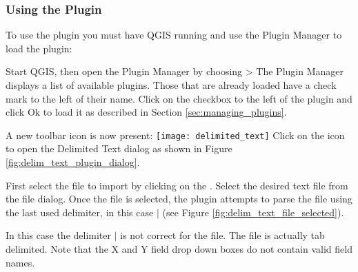 \subsubsection{Using the Plugin}
To use the plugin you must have QGIS running and use the Plugin Manager to load the plugin:

Start QGIS, then open the Plugin Manager by choosing  > 
The Plugin Manager displays a list of available plugins.
Those that are already loaded have a check mark to the left of their name.
Click on the checkbox to the left of the  plugin and click Ok to load it as described in Section \ref{sec:managing_plugins}.


A new toolbar icon is now present:
\texttt{[image: delimited\_text]}
Click on the icon  to open the Delimited Text dialog as shown in Figure
\ref{fig:delim_text_plugin_dialog}.


First select the file to import by clicking on the \browsebutton .
Select the desired text file from the file dialog.
Once the file is selected, the plugin attempts to parse the file using the last used delimiter, in this case \mbox{$|$} (see Figure \ref{fig:delim_text_file_selected}).

  
In this case the delimiter \mbox{$|$} is not correct for the file.
The file is actually tab delimited.
Note that the X and Y field drop down boxes do not contain valid field names.


